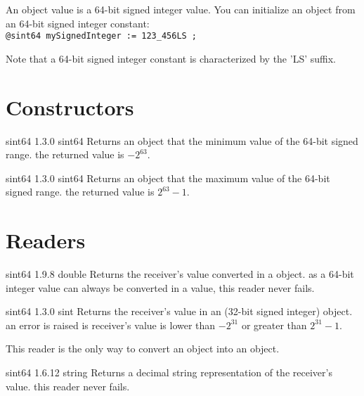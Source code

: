 

An  object value is a 64-bit signed integer value. You can initialize an  object from an 64-bit signed integer constant:\\

\texttt{@sint64 mySignedInteger := 123\_456LS ;}

Note that a 64-bit signed integer constant is characterized by the 'LS' suffix.

\section{Constructors}


{sint64}
{1.3.0}
{sint64}
{Returns an  object that the minimum value of the 64-bit signed range.}
{the returned value is $-2^{63}$.}





{sint64}
{1.3.0}
{sint64}
{Returns an  object that the maximum value of the 64-bit signed range.}
{the returned value is $2^{63}-1$.}


\section{Readers}


{sint64}
{1.9.8}
{double}
{Returns the receiver's value converted in a  object.}
{as a 64-bit integer value can always be converted in a  value, this reader never fails.}




{sint64}
{1.3.0}
{sint}
{Returns the receiver's value in an  (32-bit signed integer) object.}
{an error is raised is receiver's value is lower than $-2^{31}$ or greater than $2^{31}-1$.}

This reader is the only way to convert an  object into an  object.





{sint64}
{1.6.12}
{string}
{Returns a decimal string representation of the receiver's value.}
{this reader never fails.}








